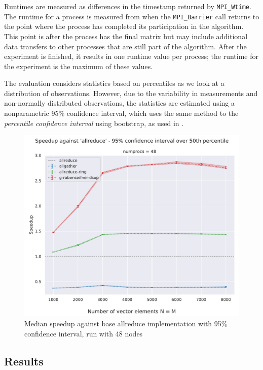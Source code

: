 \documentclass[letterpaper]{article}
\begin{document}
Runtimes are measured as differences in the timestamp returned by \verb|MPI_Wtime|.
The runtime for a process is measured from when the \verb|MPI_Barrier| call returns to the point where the process has completed its participation in the algorithm.
This point is after the process has the final matrix but may include additional data transfers to other processes that are still part of the algorithm.
After the experiment is finished, it results in one runtime value per process; the runtime for the experiment is the maximum of these values.


The evaluation considers statistics based on percentiles as we look at a distribution of observations. However, due to the variability in measurements and non-normally distributed observations, the statistics are estimated using a nonparametric 95\% confidence interval, which uses the same method to the \textit{percentile confidence interval} using bootstrap, as used in \cite[Chapter 5.7]{modern_applied_statistics_with_S}.

\begin{figure}[bhtp!]
    \centering
    \includegraphics[width=0.95\columnwidth]{plots/speedup_plot_N_numprocs_48__baseline_allreduce_percentile_50_CI_0.95_with_errorbar.pdf}
    \caption{Median speedup against base allreduce implementation with 95\% confidence interval, run with 48 nodes}
    \label{fig:speedup-48-50-95}
\end{figure}


\subsection{Results}
    
\end{document}
